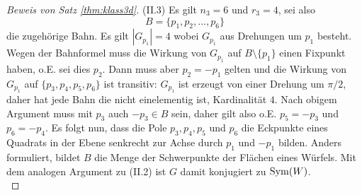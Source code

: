 \documentclass{book}
\begin{document}
\begin{proof}[Beweis von Satz \ref{thm:klass3d}]
    \noindent
    (II.3) Es gilt $n_3 = 6$ und $r_3 = 4$, sei also
    \[
        B = \{p_1, p_2, ... , p_6\}
    \]
    die zugehörige Bahn. Es gilt $|G_{p_1}| = 4$ wobei $G_{p_1}$ aus Drehungen
    um $p_1$ besteht. Wegen der Bahnformel muss die Wirkung von $G_{p_1}$ auf
    $B \setminus \{p_1\}$ einen Fixpunkt haben, o.E. sei dies $p_2$. Dann muss
    aber $p_2 = -p_1$ gelten und die Wirkung von $G_{p_1}$ auf $\{p_3, p_4,
    p_5, p_6\}$ ist transitiv: $G_{p_1}$ ist erzeugt von einer Drehung um
    $\pi/2$, daher hat jede Bahn die nicht einelementig ist, Kardinalität $4$.
    Nach obigem Argument muss mit $p_3$ auch $-p_3 \in B$ sein, daher gilt also
    o.E. $p_5= -p_3$ und $p_6 = -p_4$. Es folgt nun, dass die Pole
    $p_3,p_4,p_5$ und $p_6$ die Eckpunkte eines Quadrats in der Ebene senkrecht
    zur Achse durch $p_1$ und $-p_1$ bilden. Anders formuliert, bildet $B$ die
    Menge der Schwerpunkte der Flächen eines Würfels. Mit dem analogen Argument
    zu (II.2) ist $G$ damit konjugiert zu $\operatorname{Sym}(W)$.\\


\end{proof}
\end{document}
